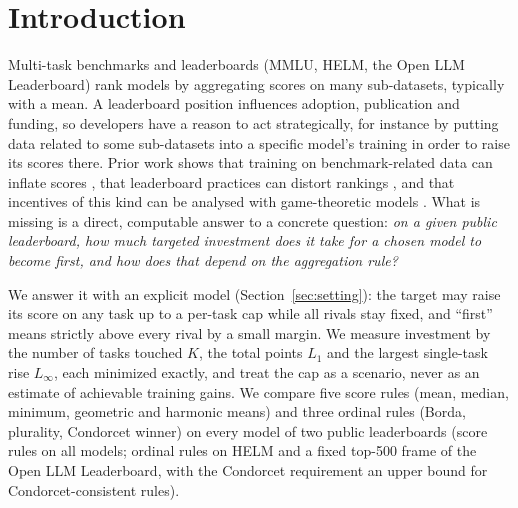 \section{Introduction}
\label{sec:intro}
Multi-task benchmarks and leaderboards (MMLU, HELM, the Open LLM Leaderboard) rank models by aggregating scores on many sub-datasets, typically with a mean. A leaderboard position influences adoption, publication and funding, so developers have a reason to act strategically, for instance by putting data related to some sub-datasets into a specific model's training in order to raise its scores there. Prior work shows that training on benchmark-related data can inflate scores \citep{zhou2023cheater,yang2023rephrased}, that leaderboard practices can distort rankings \citep{singh2025illusion}, and that incentives of this kind can be analysed with game-theoretic models \citep{chen2026incentives}. What is missing is a direct, computable answer to a concrete question: \emph{on a given public leaderboard, how much targeted investment does it take for a chosen model to become first, and how does that depend on the aggregation rule?}

We answer it with an explicit model (Section~\ref{sec:setting}): the target may raise its score on any task up to a per-task cap while all rivals stay fixed, and ``first'' means strictly above every rival by a small margin. We measure investment by the number of tasks touched $K$, the total points $L_1$ and the largest single-task rise $L_\infty$, each minimized exactly, and treat the cap as a scenario, never as an estimate of achievable training gains. We compare five score rules (mean, median, minimum, geometric and harmonic means) and three ordinal rules (Borda, plurality, Condorcet winner) on every model of two public leaderboards (score rules on all models; ordinal rules on HELM and a fixed top-500 frame of the Open LLM Leaderboard, with the Condorcet requirement an upper bound for Condorcet-consistent rules).

